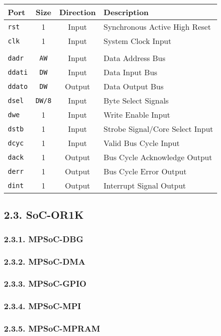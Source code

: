 \documentclass[]{article}
\begin{document}
\begin{longtable}[]{@{}lccl@{}}
\toprule
Port & Size & Direction & Description\tabularnewline
\midrule
\endhead
\texttt{rst} & 1 & Input & Synchronous Active High Reset\tabularnewline
\texttt{clk} & 1 & Input & System Clock Input\tabularnewline
& & &\tabularnewline
\texttt{dadr} & \texttt{AW} & Input & Data Address Bus\tabularnewline
\texttt{ddati} & \texttt{DW} & Input & Data Input Bus\tabularnewline
\texttt{ddato} & \texttt{DW} & Output & Data Output Bus\tabularnewline
\texttt{dsel} & \texttt{DW/8} & Input & Byte Select
Signals\tabularnewline
\texttt{dwe} & 1 & Input & Write Enable Input\tabularnewline
\texttt{dstb} & 1 & Input & Strobe Signal/Core Select
Input\tabularnewline
\texttt{dcyc} & 1 & Input & Valid Bus Cycle Input\tabularnewline
\texttt{dack} & 1 & Output & Bus Cycle Acknowledge Output\tabularnewline
\texttt{derr} & 1 & Output & Bus Cycle Error Output\tabularnewline
\texttt{dint} & 1 & Output & Interrupt Signal Output\tabularnewline
\bottomrule
\end{longtable}

\subsection{2.3. SoC-OR1K}\label{soc-or1k}

\subsubsection{2.3.1. MPSoC-DBG}\label{mpsoc-dbg}

\subsubsection{2.3.2. MPSoC-DMA}\label{mpsoc-dma}

\subsubsection{2.3.3. MPSoC-GPIO}\label{mpsoc-gpio}

\subsubsection{2.3.4. MPSoC-MPI}\label{mpsoc-mpi}

\subsubsection{2.3.5. MPSoC-MPRAM}\label{mpsoc-mpram}
\end{document}

